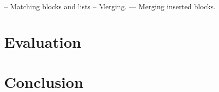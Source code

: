 \documentclass[11pt]{article}
\begin{document}
-- Matching blocks and lists
-- Merging.
--- Merging inserted blocks.

\clearpage
\section{Evaluation}

\clearpage
\section{Conclusion}

\clearpage



\end{document}
